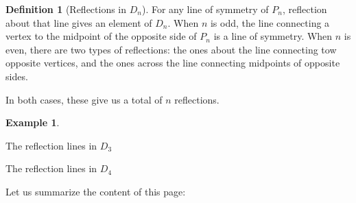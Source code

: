 \documentclass[12pt]{report}
\numberwithin{equation}{section}
\numberwithin{theorem}{chapter}
\theoremstyle{definition}
\newtheorem{definition}[theorem]{Definition}
\newtheorem{example}[theorem]{Example}
\newtheorem*{basic properties}{Basic Properties}
\newtheorem*{Important Remark}{Important Remark}
\begin{document}
\begin{definition}[Reflections in $D_n$]\label{reflections of $D_n$}
	For any line of symmetry of $P_n$, reflection about that line gives an element of $D_n$.  When $n$ is odd, the line connecting a vertex to the midpoint of the opposite side of $P_n$ is a line of symmetry. When $n$ is even, there are two types of reflections: the ones about the line connecting tow opposite vertices, and the ones across the line connecting midpoints of opposite sides.	
	
	In both cases, these give us a total of $n$ reflections.
\end{definition}
 


\begin{example}
\begin{minipage}{0.4\textwidth}
\begin{center}

\vspace{2.4em}

The reflection lines in $D_3$
\end{center}
\end{minipage}
\begin{minipage}{0.4\textwidth}
\begin{center}

The reflection lines in $D_4$
\end{center}
\end{minipage}

\vspace{0.5em}
\end{example}


\vspace{1.5em}

Let us summarize the content of this page:
\end{document}
